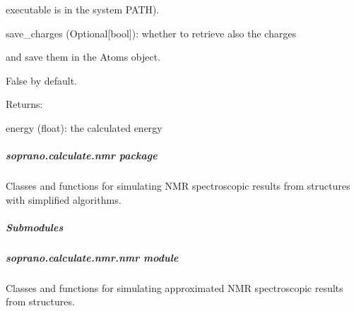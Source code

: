 \documentclass[letterpaper,10pt,english]{sphinxmanual}
\begin{document}
\begin{fulllineitems}
\begin{DUlineblock}{0em}
\begin{DUlineblock}{\DUlineblockindent}
\begin{DUlineblock}{\DUlineblockindent}
\item[] executable is in the system PATH).
\end{DUlineblock}
\item[] save\_charges (Optional{[}bool{]}): whether to retrieve also the charges
\item[]
\begin{DUlineblock}{\DUlineblockindent}
\item[] and save them in the Atoms object.
\item[] False by default.
\end{DUlineblock}
\end{DUlineblock}
\end{DUlineblock}

\begin{DUlineblock}{0em}
\item[] Returns:
\item[]
\begin{DUlineblock}{\DUlineblockindent}
\item[] energy (float): the calculated energy
\end{DUlineblock}
\end{DUlineblock}

\end{fulllineitems}



\subparagraph{soprano.calculate.nmr package}
\label{doctree/soprano.calculate.nmr:module-soprano.calculate.nmr}\label{doctree/soprano.calculate.nmr::doc}\label{doctree/soprano.calculate.nmr:soprano-calculate-nmr-package}
Classes and functions for simulating NMR spectroscopic results from
structures with simplified algorithms.


\subparagraph{Submodules}
\label{doctree/soprano.calculate.nmr:submodules}

\subparagraph{soprano.calculate.nmr.nmr module}
\label{doctree/soprano.calculate.nmr.nmr:module-soprano.calculate.nmr.nmr}\label{doctree/soprano.calculate.nmr.nmr:soprano-calculate-nmr-nmr-module}\label{doctree/soprano.calculate.nmr.nmr::doc}
Classes and functions for simulating approximated NMR spectroscopic results
from structures.
\end{document}
